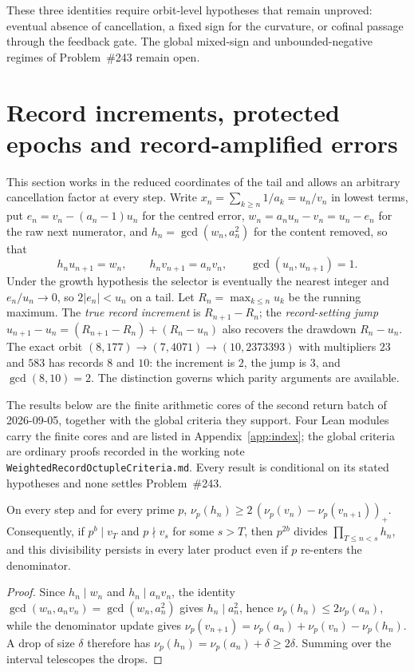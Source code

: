 These three identities require orbit-level hypotheses that remain unproved:
eventual absence of cancellation, a fixed sign for the curvature, or cofinal
passage through the feedback gate.  The global mixed-sign and
unbounded-negative regimes of Problem~\#243 remain open.


\section{Record increments, protected epochs and record-amplified errors}\label{sec:records}

This section works in the reduced coordinates of the tail and allows an
arbitrary cancellation factor at every step.  Write
$x_n=\sum_{k\ge n}1/a_k=u_n/v_n$ in lowest terms, put
$e_n=v_n-(a_n-1)u_n$ for the centred error, $w_n=a_nu_n-v_n=u_n-e_n$ for the
raw next numerator, and $h_n=\gcd(w_n,a_n^2)$ for the content removed, so that
\[
 h_nu_{n+1}=w_n,\qquad h_nv_{n+1}=a_nv_n,\qquad \gcd(u_n,u_{n+1})=1 .
\]
Under the growth hypothesis the selector is eventually the nearest integer and
$e_n/u_n\to0$, so $2|e_n|<u_n$ on a tail.  Let $R_n=\max_{k\le n}u_k$ be the
running maximum.  The \emph{true record increment} is $R_{n+1}-R_n$; the
\emph{record-setting jump} $u_{n+1}-u_n=(R_{n+1}-R_n)+(R_n-u_n)$ also recovers
the drawdown $R_n-u_n$.  The exact orbit
$(8,177)\to(7,4071)\to(10,2373393)$ with multipliers $23$ and $583$ has
records $8$ and $10$: the increment is $2$, the jump is $3$, and
$\gcd(8,10)=2$.  The distinction governs which parity arguments are available.

The results below are the finite arithmetic cores of the second return batch of
2026-09-05, together with the global criteria they support.  Four Lean modules
carry the finite cores and are listed in Appendix~\ref{app:index}; the global
criteria are ordinary proofs recorded in the working note
\texttt{WeightedRecordOctupleCriteria.md}.  Every result is conditional on its
stated hypotheses and none settles Problem~\#243.

\begin{theorem}\label{res:squarepayment}
On every step and for every prime $p$,
$\nu_p(h_n)\ge2\,(\nu_p(v_n)-\nu_p(v_{n+1}))_+$.  Consequently, if $p^b\mid v_T$
and $p\nmid v_s$ for some $s>T$, then $p^{2b}$ divides $\prod_{T\le n<s}h_n$, and
this divisibility persists in every later product even if $p$ re-enters the
denominator.
\end{theorem}

\begin{proof}
Since $h_n\mid w_n$ and $h_n\mid a_nv_n$, the identity
$\gcd(w_n,a_nv_n)=\gcd(w_n,a_n^2)$ gives $h_n\mid a_n^2$, hence
$\nu_p(h_n)\le2\nu_p(a_n)$, while the denominator update gives
$\nu_p(v_{n+1})=\nu_p(a_n)+\nu_p(v_n)-\nu_p(h_n)$.  A drop of size $\delta$
therefore has $\nu_p(h_n)=\nu_p(a_n)+\delta\ge2\delta$.  Summing over the
interval telescopes the drops.
\end{proof}

